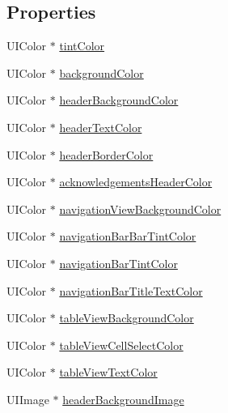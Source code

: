 \subsection*{Properties}
\begin{DoxyCompactItemize}
\item 
U\+I\+Color $\ast$ \hyperlink{interface_r_f_about_view_controller_afe63a728705f3cbc1e80ed7a88d261d6}{tint\+Color}
\item 
U\+I\+Color $\ast$ \hyperlink{interface_r_f_about_view_controller_afd81a5d5de125276ca18ebe3be0c69e1}{background\+Color}
\item 
U\+I\+Color $\ast$ \hyperlink{interface_r_f_about_view_controller_aa5bb3fda6aa7a1a085b0c9e846f67563}{header\+Background\+Color}
\item 
U\+I\+Color $\ast$ \hyperlink{interface_r_f_about_view_controller_ac3df88bf9ad9ff5bc15476d34a4ffc9d}{header\+Text\+Color}
\item 
U\+I\+Color $\ast$ \hyperlink{interface_r_f_about_view_controller_ad1c77f147663e58a79c328e4f3cf0d7b}{header\+Border\+Color}
\item 
U\+I\+Color $\ast$ \hyperlink{interface_r_f_about_view_controller_ab45856e8b46beec498fc4f7df02e893f}{acknowledgements\+Header\+Color}
\item 
U\+I\+Color $\ast$ \hyperlink{interface_r_f_about_view_controller_adccd7e7ce64f8665a82cb691e2a9c2da}{navigation\+View\+Background\+Color}
\item 
U\+I\+Color $\ast$ \hyperlink{interface_r_f_about_view_controller_aeed798742a135ee9f1412e72caf7ffd3}{navigation\+Bar\+Bar\+Tint\+Color}
\item 
U\+I\+Color $\ast$ \hyperlink{interface_r_f_about_view_controller_ae5ebc15008b00e5c27f4a2c62c919fbd}{navigation\+Bar\+Tint\+Color}
\item 
U\+I\+Color $\ast$ \hyperlink{interface_r_f_about_view_controller_a0de40383ffb4e78af2ef50bfa3e33bf0}{navigation\+Bar\+Title\+Text\+Color}
\item 
U\+I\+Color $\ast$ \hyperlink{interface_r_f_about_view_controller_a96944770e86701d5209191b378157f3c}{table\+View\+Background\+Color}
\item 
U\+I\+Color $\ast$ \hyperlink{interface_r_f_about_view_controller_a9a4efaabc35802118760a5f621d1bb45}{table\+View\+Cell\+Select\+Color}
\item 
U\+I\+Color $\ast$ \hyperlink{interface_r_f_about_view_controller_a4a3eebb1c1bcdbf534cba553490f5693}{table\+View\+Text\+Color}
\item 
U\+I\+Image $\ast$ \hyperlink{interface_r_f_about_view_controller_aee705d94eff74be1f13784f1ffefc2df}{header\+Background\+Image}

\end{DoxyCompactItemize}
